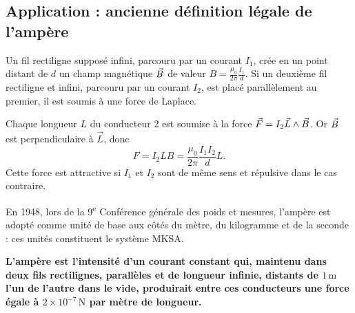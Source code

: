 \documentclass[11pt,a4paper]{article}
\newcommand{\unite}[1]{\,\mathrm{#1}}
\begin{document}
\subsection{Application : ancienne définition légale de l'ampère}\label{sec:definition}
\noindent\begin{minipage}[c]{.69\linewidth}
Un fil rectiligne supposé infini, parcouru par un courant \(I_1\), crée en un point distant
de \(d\) un champ magnétique \(\vec B\) de valeur \(\displaystyle B=\frac{\mu_0}{2\pi}\frac{I_1}{d}\).
Si un deuxième fil rectiligne et infini, parcouru par un courant \(I_2\), est placé
parallèlement au premier, il est soumis à une force de Laplace.

Chaque longueur \(L\) du conducteur 2 est soumise à la force \(\vec F=I_2\vec L\wedge\vec B\).
Or \(\vec B\) est perpendiculaire à \(\vec L\), donc
\[
 F=I_2LB=\frac{\mu_0}{2\pi}\frac{I_1I_2}{d}L .
\]
Cette force est attractive si \(I_1\) et \(I_2\) sont de même sens et répulsive dans le cas
contraire.
\end{minipage}\hfill\begin{minipage}[c]{.28\linewidth}\centering
{}
\end{minipage}\par
{}
En 1948, lors de la 9\textsuperscript{e} Conférence générale des poids et mesures, l'ampère
est adopté comme unité de base aux côtés du mètre, du kilogramme et de la seconde : ces unités
constituent le système MKSA.
\begin{cadre}
\textbf{L'ampère est l'intensité d'un courant constant qui, maintenu dans deux fils rectilignes,
parallèles et de longueur infinie, distants de \(1\unite m\) l'un de l'autre dans le vide,
produirait entre ces conducteurs une force égale à \(2\times10^{-7}\unite N\) par mètre de
longueur.}
\end{cadre}
\end{document}
